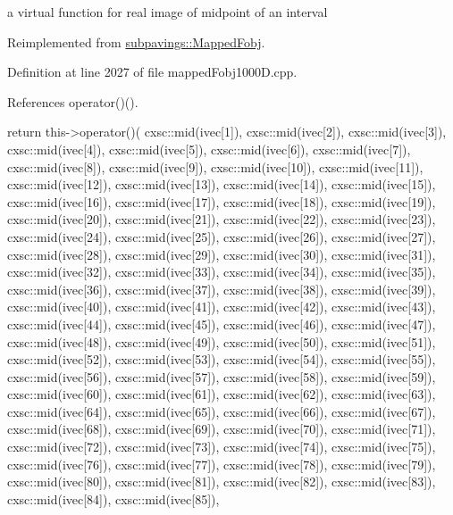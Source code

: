 a virtual function for real image of midpoint of an interval 



\-Reimplemented from \hyperlink{classsubpavings_1_1MappedFobj_afc045feebc8ad8fc2a84e0532bf0648d}{subpavings\-::\-Mapped\-Fobj}.



\-Definition at line 2027 of file mapped\-Fobj1000\-D.\-cpp.



\-References operator()().


\begin{DoxyCode}
{
  return this->operator()(
    cxsc::mid(ivec[1]),
  cxsc::mid(ivec[2]),
  cxsc::mid(ivec[3]),
  cxsc::mid(ivec[4]),
  cxsc::mid(ivec[5]),
  cxsc::mid(ivec[6]),
  cxsc::mid(ivec[7]),
  cxsc::mid(ivec[8]),
  cxsc::mid(ivec[9]),
  cxsc::mid(ivec[10]),
  cxsc::mid(ivec[11]),
  cxsc::mid(ivec[12]),
  cxsc::mid(ivec[13]),
  cxsc::mid(ivec[14]),
  cxsc::mid(ivec[15]),
  cxsc::mid(ivec[16]),
  cxsc::mid(ivec[17]),
  cxsc::mid(ivec[18]),
  cxsc::mid(ivec[19]),
  cxsc::mid(ivec[20]),
  cxsc::mid(ivec[21]),
  cxsc::mid(ivec[22]),
  cxsc::mid(ivec[23]),
  cxsc::mid(ivec[24]),
  cxsc::mid(ivec[25]),
  cxsc::mid(ivec[26]),
  cxsc::mid(ivec[27]),
  cxsc::mid(ivec[28]),
  cxsc::mid(ivec[29]),
  cxsc::mid(ivec[30]),
  cxsc::mid(ivec[31]),
  cxsc::mid(ivec[32]),
  cxsc::mid(ivec[33]),
  cxsc::mid(ivec[34]),
  cxsc::mid(ivec[35]),
  cxsc::mid(ivec[36]),
  cxsc::mid(ivec[37]),
  cxsc::mid(ivec[38]),
  cxsc::mid(ivec[39]),
  cxsc::mid(ivec[40]),
  cxsc::mid(ivec[41]),
  cxsc::mid(ivec[42]),
  cxsc::mid(ivec[43]),
  cxsc::mid(ivec[44]),
  cxsc::mid(ivec[45]),
  cxsc::mid(ivec[46]),
  cxsc::mid(ivec[47]),
  cxsc::mid(ivec[48]),
  cxsc::mid(ivec[49]),
  cxsc::mid(ivec[50]),
  cxsc::mid(ivec[51]),
  cxsc::mid(ivec[52]),
  cxsc::mid(ivec[53]),
  cxsc::mid(ivec[54]),
  cxsc::mid(ivec[55]),
  cxsc::mid(ivec[56]),
  cxsc::mid(ivec[57]),
  cxsc::mid(ivec[58]),
  cxsc::mid(ivec[59]),
  cxsc::mid(ivec[60]),
  cxsc::mid(ivec[61]),
  cxsc::mid(ivec[62]),
  cxsc::mid(ivec[63]),
  cxsc::mid(ivec[64]),
  cxsc::mid(ivec[65]),
  cxsc::mid(ivec[66]),
  cxsc::mid(ivec[67]),
  cxsc::mid(ivec[68]),
  cxsc::mid(ivec[69]),
  cxsc::mid(ivec[70]),
  cxsc::mid(ivec[71]),
  cxsc::mid(ivec[72]),
  cxsc::mid(ivec[73]),
  cxsc::mid(ivec[74]),
  cxsc::mid(ivec[75]),
  cxsc::mid(ivec[76]),
  cxsc::mid(ivec[77]),
  cxsc::mid(ivec[78]),
  cxsc::mid(ivec[79]),
  cxsc::mid(ivec[80]),
  cxsc::mid(ivec[81]),
  cxsc::mid(ivec[82]),
  cxsc::mid(ivec[83]),
  cxsc::mid(ivec[84]),
  cxsc::mid(ivec[85]),
}
\end{DoxyCode}
